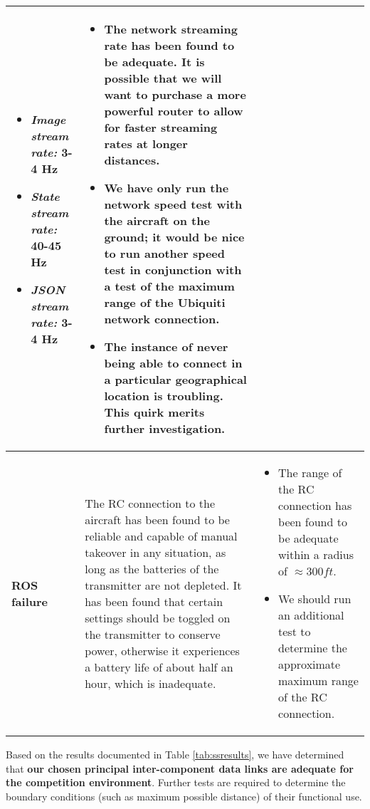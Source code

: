 \documentclass[]{auvsi_doc}
\begin{document}
\begin{center}
\begin{longtable}[H]{|P{3cm}|P{5.75cm}|P{5.75cm}|}
\begin{itemize}
			\item \textit{Image stream rate:} 3-4 Hz
			\item \textit{State stream rate:} 40-45 Hz
			\item \textit{JSON stream rate:} 3-4 Hz
		\end{itemize} &	\begin{itemize}
		\item The network streaming rate has been found to be adequate. It is possible that we will want to purchase a more powerful router to allow for faster streaming rates at longer distances.
		\item We have only run the network speed test with the aircraft on the ground; it would be nice to run another speed test in conjunction with a test of the maximum range of the Ubiquiti network connection.
		\item The instance of never being able to connect in a particular geographical location is troubling. This quirk merits further investigation.
	\end{itemize} \\
		\hline
		\textbf{ROS failure}	& The RC connection to the aircraft has been found to be reliable and capable of manual takeover in any situation, as long as the batteries of the transmitter are not depleted. It has been found that certain settings should be toggled on the transmitter to conserve power, otherwise it experiences a battery life of about half an hour, which is inadequate. & \begin{itemize}
			\item The range of the RC connection has been found to be adequate within a radius of $\approx 300ft$.
			\item We should run an additional test to determine the approximate maximum range of the RC connection.
		\end{itemize} \\
		\hline
	\end{longtable}
\end{center}

Based on the results documented in Table \ref{tab:ssresults}, we have determined that \textbf{our chosen principal inter-component data links are adequate for the competition environment}. Further tests are required to determine the boundary conditions (such as maximum possible distance) of their functional use.
\end{document}
